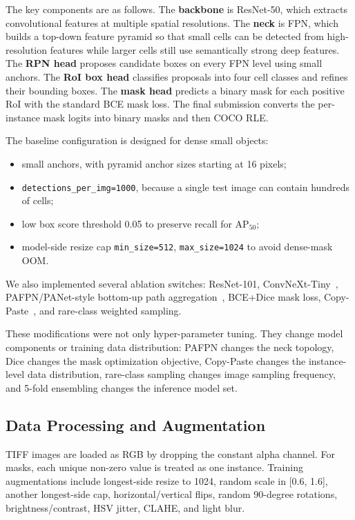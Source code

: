 \documentclass[10pt,twocolumn,letterpaper]{article}
\begin{document}
The key components are as follows. The \textbf{backbone} is ResNet-50, which extracts convolutional features at multiple spatial resolutions. The \textbf{neck} is FPN, which builds a top-down feature pyramid so that small cells can be detected from high-resolution features while larger cells still use semantically strong deep features. The \textbf{RPN head} proposes candidate boxes on every FPN level using small anchors. The \textbf{RoI box head} classifies proposals into four cell classes and refines their bounding boxes. The \textbf{mask head} predicts a binary mask for each positive RoI with the standard BCE mask loss. The final submission converts the per-instance mask logits into binary masks and then COCO RLE.

The baseline configuration is designed for dense small objects:
\begin{itemize}
  \item small anchors, with pyramid anchor sizes starting at 16 pixels;
  \item \texttt{detections\_per\_img=1000}, because a single test image can contain hundreds of cells;
  \item low box score threshold 0.05 to preserve recall for AP$_{50}$;
  \item model-side resize cap \texttt{min\_size=512}, \texttt{max\_size=1024} to avoid dense-mask OOM.
\end{itemize}

We also implemented several ablation switches: ResNet-101, ConvNeXt-Tiny~\cite{liu2022convnet}, PAFPN/PANet-style bottom-up path aggregation~\cite{liu2018path}, BCE+Dice mask loss, Copy-Paste~\cite{ghiasi2021simple}, and rare-class weighted sampling.

These modifications were not only hyper-parameter tuning. They change model components or training data distribution: PAFPN changes the neck topology, Dice changes the mask optimization objective, Copy-Paste changes the instance-level data distribution, rare-class sampling changes image sampling frequency, and 5-fold ensembling changes the inference model set.

\subsection{Data Processing and Augmentation}
TIFF images are loaded as RGB by dropping the constant alpha channel. For masks, each unique non-zero value is treated as one instance. Training augmentations include longest-side resize to 1024, random scale in [0.6, 1.6], another longest-side cap, horizontal/vertical flips, random 90-degree rotations, brightness/contrast, HSV jitter, CLAHE, and light blur.
\end{document}
